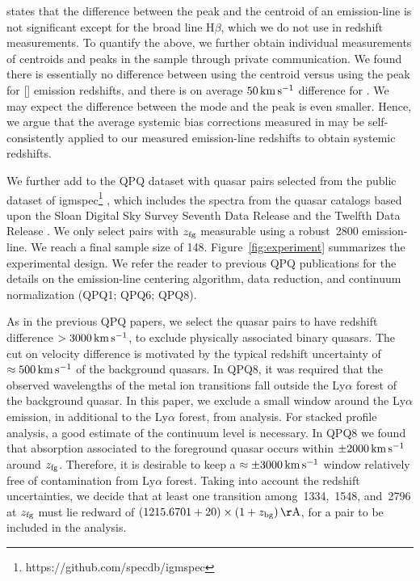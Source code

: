 \documentclass[iop]{emulateapj}
\begin{document}
states that the difference between the peak and the centroid of an emission-line
is not significant except for the broad line H$\beta$, which we do not use in redshift
measurements. To quantify the above, we further obtain individual measurements of centroids and
peaks in the \cite{Shen+16} sample through private communication. We found there is essentially no
difference between using the centroid versus using the peak for [] emission redshifts,
and there is on average $50\,{\rm km\,s^{-1}}$ difference for . We may expect the
difference between the mode and the peak is even smaller. Hence, we argue that the average
systemic bias corrections measured in \cite{Shen+16} may be self-consistently applied to our
measured emission-line redshifts to obtain systemic redshifts.

We further add to the QPQ dataset with quasar pairs selected from the public dataset of
igmspec\footnote{https://github.com/specdb/igmspec} \citep{Prochaska+17}, which includes the
spectra from the quasar catalogs based upon the Sloan Digital Sky Survey Seventh Data Release
\citep{Schneider+10} and the Twelfth Data Release \citep{Paris+17}. We only select pairs with
$z_{\rm fg}$ measurable using a robust \,2800 emission-line.
We reach a final sample size of 148.
Figure~\ref{fig:experiment} summarizes the experimental design. We refer the reader to previous
QPQ publications for the details on the emission-line centering algorithm, data reduction, and
continuum normalization (QPQ1; QPQ6; QPQ8).

As in the previous QPQ papers, we select the quasar pairs to have redshift difference
$>3000\,{\rm km\,s^{-1}}$, to exclude physically associated binary quasars. The cut on velocity
difference is motivated by the typical redshift uncertainty of $\approx500\,{\rm km\,s^{-1}}$ of
the background quasars. In QPQ8, it was required that the observed wavelengths of the
metal ion transitions fall outside the Ly$\alpha$ forest of the background quasar. In this paper,
we exclude a small window around the Ly$\alpha$ emission, in additional to the Ly$\alpha$ forest,
from analysis. For stacked profile analysis, a good estimate of
the continuum level is necessary. In QPQ8 we found that absorption associated to
the foreground quasar occurs within $\pm2000\,{\rm km\,s^{-1}}$ around $z_{\rm fg}$. Therefore, it
is desirable to keep a $\approx\pm3000\,{\rm km\,s^{-1}}$ window relatively free of contamination
from Ly$\alpha$ forest. Taking into account the redshift uncertainties,
we decide that at least one transition among \,1334, \,1548, and
\,2796 at $z_{\rm fg}$ must lie redward of
$(1215.6701+20)\times(1+z_{\rm bg})\,{\rm \AA}$, for a pair to be included in the analysis.
\end{document}
